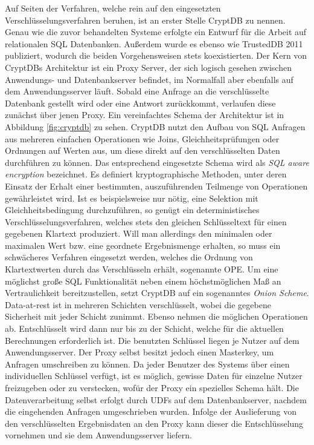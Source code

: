 Auf Seiten der Verfahren, welche rein auf den eingesetzten Verschlüsselungsverfahren beruhen, ist an erster Stelle CryptDB \cite{Popa2011}\cite{Popa2012} zu nennen. Genau wie die zuvor behandelten Systeme erfolgte ein Entwurf für die Arbeit auf relationalen \ac{SQL} Datenbanken. Außerdem wurde es ebenso wie TrustedDB 2011 publiziert, wodurch die beiden Vorgehensweisen stets koexistierten. Der Kern von CryptDBs Architektur ist ein Proxy Server, der sich logisch gesehen zwischen Anwendungs- und Datenbankserver befindet, im Normalfall aber ebenfalls auf dem Anwendungsserver läuft. Sobald eine Anfrage an die verschlüsselte Datenbank gestellt wird oder eine Antwort zurückkommt, verlaufen diese zunächst über jenen Proxy. Ein vereinfachtes Schema der Architektur ist in Abbildung \ref{fig:cryptdb} zu sehen. CryptDB nutzt den Aufbau von \ac{SQL} Anfragen aus mehreren einfachen Operationen wie Joins, Gleichheitsprüfungen oder Ordnungen auf Werten aus, um diese direkt auf den verschlüsselten Daten durchführen zu können. Das entsprechend eingesetzte Schema wird als \textit{SQL aware encryption} bezeichnet. Es definiert kryptographische Methoden, unter deren Einsatz der Erhalt einer bestimmten, auszuführenden Teilmenge von Operationen gewährleistet wird. Ist es beispielsweise nur nötig, eine Selektion mit Gleichheitsbedingung durchzuführen, so genügt ein deterministisches Verschlüsselungsverfahren, welches stets den gleichen Schlüsseltext für einen gegebenen Klartext produziert. Will man allerdings den minimalen oder maximalen Wert bzw. eine geordnete Ergebnismenge erhalten, so muss ein schwächeres Verfahren eingesetzt werden, welches die Ordnung von Klartextwerten durch das Verschlüsseln erhält, sogenannte \ac{OPE}. Um eine möglichst große \ac{SQL} Funktionalität neben einem höchstmöglichen Maß an Vertraulichkeit bereitzustellen, setzt CryptDB auf ein sogenanntes \textit{Onion Scheme}. Data-at-rest ist in mehreren Schichten verschlüsselt, wobei die gegebene Sicherheit mit jeder Schicht zunimmt. Ebenso nehmen die möglichen Operationen ab. Entschlüsselt wird dann nur bis zu der Schicht, welche für die aktuellen Berechnungen erforderlich ist. Die benutzten Schlüssel liegen je Nutzer auf dem Anwendungsserver. Der Proxy selbst besitzt jedoch einen Masterkey, um Anfragen umschreiben zu können. Da jeder Benutzer des Systems über einen individuellen Schlüssel verfügt, ist es möglich, gewisse Daten für einzelne Nutzer freizugeben oder zu verstecken, wofür der Proxy ein spezielles Schema hält. Die Datenverarbeitung selbst erfolgt durch \acp{UDF} auf dem Datenbankserver, nachdem die eingehenden Anfragen umgeschrieben wurden. Infolge der Auslieferung von den verschlüsselten Ergebnisdaten an den Proxy kann dieser die Entschlüsselung vornehmen und sie dem Anwendungsserver liefern.


